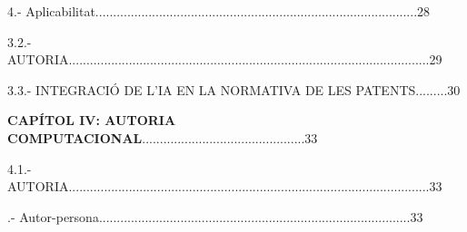 \documentclass[12pt]{article}
\begin{document}
\vspace{\baselineskip}
\begin{adjustwidth}{0.49in}{0.0in}
\begin{justify}
4.- Aplicabilitat...........................................................................................28
\end{justify}\par

\end{adjustwidth}


\vspace{\baselineskip}
\begin{justify}
3.2.- AUTORIA......................................................................................................29
\end{justify}\par


\vspace{\baselineskip}
\begin{justify}
3.3.- INTEGRACIÓ DE L’IA EN LA NORMATIVA DE LES PATENTS.........30
\end{justify}\par


\vspace{\baselineskip}

\vspace{\baselineskip}
\begin{justify}
\textbf{CAPÍTOL IV: AUTORIA COMPUTACIONAL}..............................................33
\end{justify}\par


\vspace{\baselineskip}

\vspace{\baselineskip}
\begin{justify}
4.1.- AUTORIA......................................................................................................33
\end{justify}\par


\vspace{\baselineskip}

\vspace{\baselineskip}
\begin{justify}
.- Autor-persona........................................................................................33
\end{justify}\par
\end{document}
